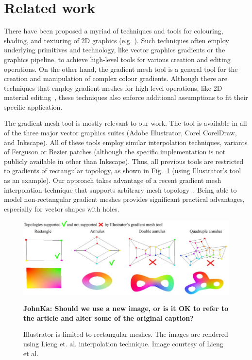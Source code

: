 \documentclass{egpubl}
\newcommand{\note}[3]{{\color{#2}\textbf{#1: #3}}}
\newcommand{\john}[1]{\note{JohnKa}{RubineRed}{#1}}
\begin{document}
	\section{Related work}
	\label{sec:RW}
	
	There have been proposed a myriad of techniques and tools for colouring, shading, and texturing of 2D graphics (e.g. \cite{Vergne:2012, Shao:2012, Orzan:2008}). Such techniques often employ underlying primitives and technology, like vector graphics gradients or the graphics pipeline, to achieve high-level tools for various creation and editing operations. On the other hand, the gradient mesh tool is a general tool for the creation and manipulation of complex colour gradients. Although there are techniques that employ gradient meshes for high-level operations, like 2D material editing~\cite{Lopez-Moreno:2013}, these techniques also enforce additional assumptions to fit their specific application.
	
	The gradient mesh tool is mostly relevant to our work. The tool is available in all of the three major vector graphics suites (Adobe Illustrator, Corel CorelDraw, and Inkscape). All of these tools employ similar interpolation techniques, variants of Ferguson or Bezier patches (although the specific implementation is not publicly available in other than Inkscape). Thus, all previous tools are restricted to gradients of rectangular topology, as shown in Fig.~\ref{fig:IllustratorVsOur} (using Illustrator's tool as an example). Our approach takes advantage of a recent gradient mesh interpolation technique that supports arbitrary mesh topology~\cite{Lieng:2016}. Being able to model non-rectangular gradient meshes provides significant practical advantages, especially for vector shapes with holes.
	
	\begin{figure}
		\includegraphics[]{illustratorVsOur.jpg}
		\caption{Illustrator is limited to rectangular meshes. The images are rendered using Lieng et. al. \cite{Lieng:2016} interpolation technique. Image courtesy of Lieng et al.}
		\john{Should we use a new image, or is it OK to refer to the article and alter some of the original caption?}
		\label{fig:IllustratorVsOur}
	\end{figure}
	
\end{document}

